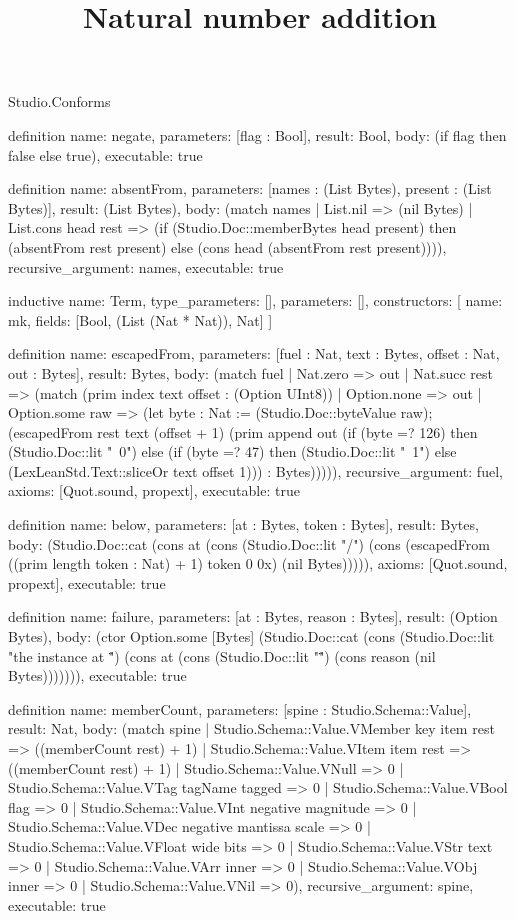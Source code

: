 \begin{lexlean}{Studio.Conforms}
\title{Natural number addition}
\begin{semanticmodule}
definition{
  name: negate,
  parameters: [flag : Bool],
  result: Bool,
  body: (if flag then false else true),
  executable: true
}

definition{
  name: absentFrom,
  parameters: [names : (List Bytes), present : (List Bytes)],
  result: (List Bytes),
  body: (match names
    | List.nil => (nil Bytes)
    | List.cons head rest => (if (Studio.Doc::memberBytes head present) then (absentFrom rest present) else (cons head (absentFrom rest present)))),
  recursive_argument: names,
  executable: true
}

inductive{
  name: Term,
  type_parameters: [],
  parameters: [],
  constructors: [
    {name: mk, fields: [Bool, (List (Nat * Nat)), Nat]}
  ]
}

definition{
  name: escapedFrom,
  parameters: [fuel : Nat, text : Bytes, offset : Nat, out : Bytes],
  result: Bytes,
  body: (match fuel
    | Nat.zero => out
    | Nat.succ rest => (match (prim index text offset : (Option UInt8))
      | Option.none => out
      | Option.some raw => (let byte : Nat := (Studio.Doc::byteValue raw); (escapedFrom rest text (offset + 1) (prim append out (if (byte =? 126) then (Studio.Doc::lit "~0") else (if (byte =? 47) then (Studio.Doc::lit "~1") else (LexLeanStd.Text::sliceOr text offset 1))) : Bytes))))),
  recursive_argument: fuel,
  axioms: [Quot.sound, propext],
  executable: true
}

definition{
  name: below,
  parameters: [at : Bytes, token : Bytes],
  result: Bytes,
  body: (Studio.Doc::cat (cons at (cons (Studio.Doc::lit "/") (cons (escapedFrom ((prim length token : Nat) + 1) token 0 0x) (nil Bytes))))),
  axioms: [Quot.sound, propext],
  executable: true
}

definition{
  name: failure,
  parameters: [at : Bytes, reason : Bytes],
  result: (Option Bytes),
  body: (ctor Option.some [Bytes] (Studio.Doc::cat (cons (Studio.Doc::lit "the instance at \"") (cons at (cons (Studio.Doc::lit "\" ") (cons reason (nil Bytes))))))),
  executable: true
}

definition{
  name: memberCount,
  parameters: [spine : Studio.Schema::Value],
  result: Nat,
  body: (match spine
    | Studio.Schema::Value.VMember key item rest => ((memberCount rest) + 1)
    | Studio.Schema::Value.VItem item rest => ((memberCount rest) + 1)
    | Studio.Schema::Value.VNull => 0
    | Studio.Schema::Value.VTag tagName tagged => 0
    | Studio.Schema::Value.VBool flag => 0
    | Studio.Schema::Value.VInt negative magnitude => 0
    | Studio.Schema::Value.VDec negative mantissa scale => 0
    | Studio.Schema::Value.VFloat wide bits => 0
    | Studio.Schema::Value.VStr text => 0
    | Studio.Schema::Value.VArr inner => 0
    | Studio.Schema::Value.VObj inner => 0
    | Studio.Schema::Value.VNil => 0),
  recursive_argument: spine,
  executable: true
}


\end{semanticmodule}
\end{lexlean}
